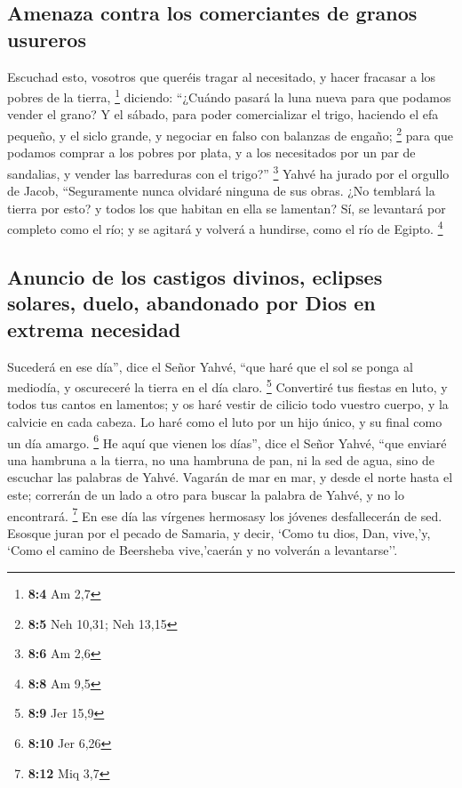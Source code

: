 \hypertarget{amenaza-contra-los-comerciantes-de-granos-usureros}{%
\subsection{Amenaza contra los comerciantes de granos
usureros}\label{amenaza-contra-los-comerciantes-de-granos-usureros}}

 Escuchad esto, vosotros que queréis tragar al necesitado,
y hacer fracasar a los pobres de la tierra, \footnote{\textbf{8:4} Am
  2,7}  diciendo: ``¿Cuándo pasará la luna nueva para que
podamos vender el grano? Y el sábado, para poder comercializar el trigo,
haciendo el efa pequeño, y el siclo grande, y negociar en falso con
balanzas de engaño; \footnote{\textbf{8:5} Neh 10,31; Neh 13,15}
 para que podamos comprar a los pobres por plata, y a los
necesitados por un par de sandalias, y vender las barreduras con el
trigo?'' \footnote{\textbf{8:6} Am 2,6}  Yahvé ha jurado
por el orgullo de Jacob, ``Seguramente nunca olvidaré ninguna de sus
obras.  ¿No temblará la tierra por esto? y todos los que
habitan en ella se lamentan? Sí, se levantará por completo como el río;
y se agitará y volverá a hundirse, como el río de Egipto. \footnote{\textbf{8:8}
  Am 9,5}

\hypertarget{anuncio-de-los-castigos-divinos-eclipses-solares-duelo-abandonado-por-dios-en-extrema-necesidad}{%
\subsection{Anuncio de los castigos divinos, eclipses solares, duelo,
abandonado por Dios en extrema
necesidad}\label{anuncio-de-los-castigos-divinos-eclipses-solares-duelo-abandonado-por-dios-en-extrema-necesidad}}

 Sucederá en ese día'', dice el Señor Yahvé, ``que haré
que el sol se ponga al mediodía, y oscureceré la tierra en el día claro.
\footnote{\textbf{8:9} Jer 15,9}  Convertiré tus fiestas
en luto, y todos tus cantos en lamentos; y os haré vestir de cilicio
todo vuestro cuerpo, y la calvicie en cada cabeza. Lo haré como el luto
por un hijo único, y su final como un día amargo. \footnote{\textbf{8:10}
  Jer 6,26}  He aquí que vienen los días'', dice el Señor
Yahvé, ``que enviaré una hambruna a la tierra, no una hambruna de pan,
ni la sed de agua, sino de escuchar las palabras de Yahvé.
 Vagarán de mar en mar, y desde el norte hasta el este;
correrán de un lado a otro para buscar la palabra de Yahvé, y no lo
encontrará. \footnote{\textbf{8:12} Miq 3,7}  En ese día
las vírgenes hermosasy los jóvenes desfallecerán de sed. 
Esosque juran por el pecado de Samaria, y decir, `Como tu dios, Dan,
vive,'y, `Como el camino de Beersheba vive,'caerán y no volverán a
levantarse''.

